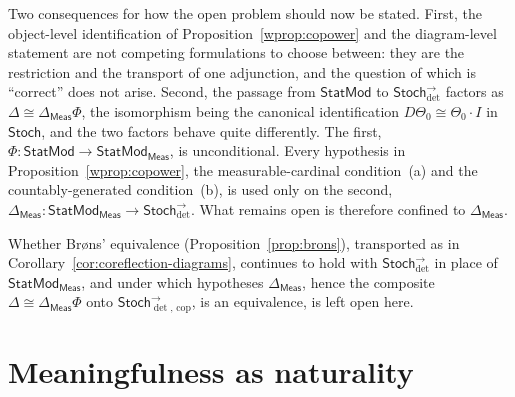 \documentclass[11pt,a4paper]{article}
\theoremstyle{plain}
\theoremstyle{definition}
\theoremstyle{remark}
\newcommand{\cat}[1]{\mathsf{#1}}
\newcommand{\Meas}{\cat{Meas}}
\newcommand{\Stoch}{\cat{Stoch}}
\newcommand{\StatMod}{\cat{StatMod}}
\newcommand{\Statk}{\StatMod_{\Meas}}
\newcommand{\Jc}{\Delta}            %
\newcommand{\Jcm}{\Delta_{\Meas}}
\newcommand{\Arrdet}[1]{#1^{\rightarrow}_{\det}}
\newcommand{\Arrcop}[1]{#1^{\rightarrow}_{\det,\,\mathrm{cop}}}
\begin{document}
Two consequences for how the open problem should now be stated. First, the
object-level identification of Proposition~\ref{wprop:copower} and the
diagram-level statement are not competing formulations to choose between: they
are the restriction and the transport of one adjunction, and the question of
which is ``correct'' does not arise. Second, the passage from $\StatMod$ to
$\Arrdet{\Stoch}$ factors as $\Jc \cong \Jcm\Phi$, the isomorphism being
the canonical identification $D\Theta_0 \cong \Theta_0 \cdot I$ in $\Stoch$,
and the two factors behave quite differently. The first,
$\Phi \colon \StatMod \to \Statk$, is unconditional. Every hypothesis in
Proposition~\ref{wprop:copower}, the measurable-cardinal condition~(a) and
the countably-generated condition~(b), is used only on the second,
$\Jcm \colon \Statk \to \Arrdet{\Stoch}$. What remains open is
therefore confined to $\Jcm$.

Whether Br\o ns' equivalence (Proposition~\ref{prop:brons}), transported as in
Corollary~\ref{cor:coreflection-diagrams}, continues to hold with
$\Arrdet{\Stoch}$ in place of $\Statk$, and under which hypotheses
$\Jcm$, hence the composite $\Jc \cong \Jcm\Phi$ onto
$\Arrcop{\Stoch}$, is an equivalence, is left open here.

\section{Meaningfulness as naturality}\label{sec:meaningful}
\end{document}
